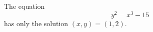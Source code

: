 \begin{proposition}\label{eq:082}
    The equation
\[
    y^2=x^3-15
\]
    has only the solution $(x,y)=(1,2)$.
\end{proposition}
